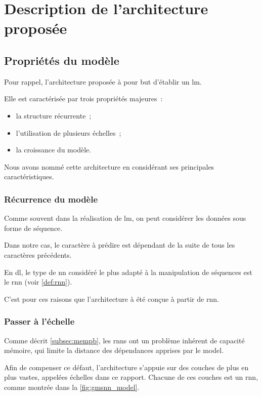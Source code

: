 {\chapter{Description de l'architecture proposée}\label{ch:gmsnn_model}
\section{Propriétés du modèle}
Pour rappel, l'architecture proposée à pour but d'établir un \gls{lm}.

Elle est caractérisée par trois propriétés majeures~:
\begin{itemize}
	\item la structure récurrente~;
	\item l'utilisation de plusieurs échelles~;
	\item la croissance du modèle.
\end{itemize}

Nous avons nommé cette architecture  en considérant ses principales caractéristiques.

\subsection{Récurrence du modèle}
Comme souvent dans la réalisation de \gls{lm}, on peut considérer les données sous forme de séquence.

Dans notre cas, le caractère à prédire est dépendant de la suite de tous les caractères précédents.

En \gls{dl}, le type de \gls{nn} considéré le plus adapté à la manipulation de séquences est le \gls{rnn} (voir \autoref{def:rnn}).

C'est pour ces raisons que l'architecture à été conçue à partir de \gls{rnn}.

\subsection{Passer à l'échelle}\label{subsec:scaling}
Comme décrit \autoref{subsec:mempb}, les \glspl{rnn} ont un problème inhérent de capacité mémoire, qui limite la distance des dépendances apprises par le \gls{model}.

Afin de compenser ce défaut, l'architecture  s'appuie sur des couches de plus en plus vastes, appelées \og échelles\fg{} dans ce rapport.
Chacune de ces couches est un \gls{rnn}, comme montrée dans la \autoref{fig:gmsnn_model}.

}
